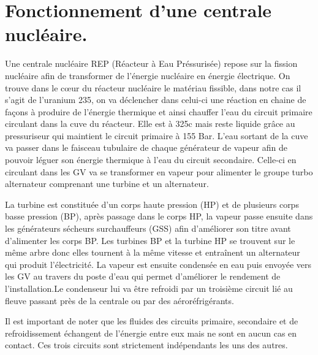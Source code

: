 \section{Fonctionnement d'une centrale nucléaire.}

Une centrale nucléaire REP (Réacteur à Eau Préssurisée) repose sur la fission nucléaire afin de transformer de l’énergie nucléaire en énergie électrique. On trouve dans le cœur du réacteur nucléaire le matériau fissible, dans notre cas il s’agit de l’uranium 235, on va déclencher dans celui-ci une réaction en chaine de façons à produire de l’énergie thermique et ainsi chauffer l’eau du circuit primaire circulant dans la cuve du réacteur. Elle est à 325c mais reste liquide grâce au pressuriseur qui maintient le circuit primaire à 155 Bar. L’eau sortant de la cuve va passer dans le faisceau tubulaire de chaque générateur de vapeur afin de pouvoir léguer son énergie thermique à l’eau du circuit secondaire. Celle-ci en circulant dans les GV va se transformer en vapeur pour alimenter le groupe turbo alternateur comprenant une turbine et un alternateur.

La turbine est constituée d'un corps haute pression (HP) et de plusieurs corps basse pression (BP), après passage dans le corps HP, la vapeur passe ensuite dans les générateurs sécheurs surchauffeurs (GSS) afin d’améliorer son titre avant d'alimenter les corps BP. Les turbines BP et la turbine HP se trouvent sur le même arbre donc elles tournent à la même vitesse et entraînent un alternateur qui produit l'électricité. La vapeur est ensuite condensée en eau puis envoyée vers les GV au travers du poste d'eau qui permet d'améliorer le rendement de l'installation.Le condenseur lui va être refroidi par un troisième circuit lié au fleuve passant près de la centrale ou par des aéroréfrigérants.

Il est important de noter que les fluides des circuits primaire, secondaire et de refroidissement échangent de l’énergie entre eux mais ne sont en aucun cas en contact. Ces trois circuits sont strictement indépendants les uns des autres.
~\cite[IRSN]{IRSN_rep_schema}

